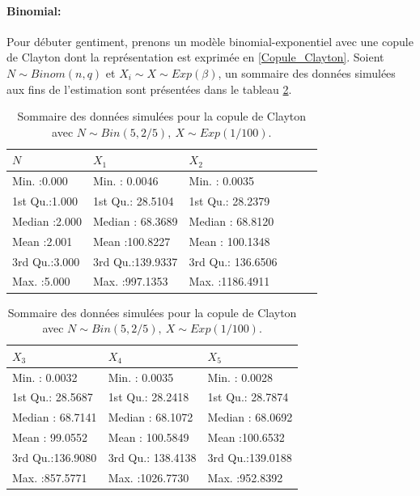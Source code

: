 \documentclass{article}
\begin{document}
	\paragraph{Binomial:}Pour débuter gentiment, prenons un modèle binomial-exponentiel avec une copule de Clayton dont la représentation est exprimée en \eqref{Copule_Clayton}.
	Soient $N \sim Binom(n,q)$ et $X_i \sim X \sim Exp(\beta)$, un sommaire des données simulées aux fins de l'estimation sont présentées dans le tableau \ref{tbl_sommaire_Clayton_Binom}.
	
	\begin{table}[ht]
		\centering
		\begin{tabular}[width=\textwidth]{llllll}
			\hline
			       $N$ &       $X_1$ &       $X_2$ &             \\ 
			\hline
			Min.   :0.000   & Min.   :  0.0046   & Min.   :   0.0035      \\ 
			1st Qu.:1.000   & 1st Qu.: 28.5104   & 1st Qu.:  28.2379      \\ 
			Median :2.000   & Median : 68.3689   & Median :  68.8120      \\ 
			Mean   :2.001   & Mean   :100.8227   & Mean   : 100.1348      \\ 
			3rd Qu.:3.000   & 3rd Qu.:139.9337   & 3rd Qu.: 136.6506      \\ 
			Max.   :5.000   & Max.   :997.1353   & Max.   :1186.4911      \\ 
			\hline
		\end{tabular}
		\begin{tabular}[width=\textwidth]{lll}
			\hline
			       $X_3$ &       $X_4$ &       $X_5$ \\ 
			\hline
			 Min.   :  0.0032   & Min.   :   0.0035   & Min.   :  0.0028   \\ 
			 1st Qu.: 28.5687   & 1st Qu.:  28.2418   & 1st Qu.: 28.7874   \\ 
			 Median : 68.7141   & Median :  68.1072   & Median : 68.0692   \\ 
			 Mean   : 99.0552   & Mean   : 100.5849   & Mean   :100.6532   \\ 
			 3rd Qu.:136.9080   & 3rd Qu.: 138.4138   & 3rd Qu.:139.0188   \\ 
			 Max.   :857.5771   & Max.   :1026.7730   & Max.   :952.8392   \\ 
			\hline
		\end{tabular}
	\caption[Sommaire des données simulées pour la copule de Clayton avec une loi de fréquence binomiale.]{Sommaire des données simulées pour la copule de Clayton avec $N \sim Bin(5, 2/5),\ X\sim Exp(1/100)$.}
	\label{tbl_sommaire_Clayton_Binom}
	\end{table}
\end{document}
